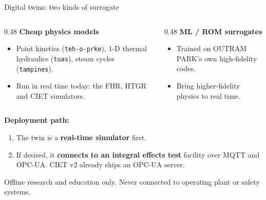 \documentclass[aspectratio=169]{beamer}
\begin{document}
\begin{frame}{Digital twins: two kinds of surrogate}
    \begin{columns}[T]
        \begin{column}{0.48\textwidth}
            \textbf{Cheap physics models}
            \begin{itemize}
                \footnotesize
                \item Point kinetics (\texttt{teh-o-prke}), 1-D thermal
                      hydraulics (\texttt{tuas}), steam cycles
                      (\texttt{tampines}).
                \item Run in real time today: the FHR, HTGR and CIET
                      simulators.
            \end{itemize}
        \end{column}
        \begin{column}{0.48\textwidth}
            \textbf{ML / ROM surrogates}
            \begin{itemize}
                \footnotesize
                \item Trained on OUTRAM PARK's own high-fidelity codes.
                \item Bring higher-fidelity physics to real time.
            \end{itemize}
        \end{column}
    \end{columns}

    \medskip
    \textbf{Deployment path:}
    \begin{enumerate}
        \item The twin is a \textbf{real-time simulator} first.
        \item If desired, it \textbf{connects to an integral effects test}
              facility over MQTT and OPC-UA. CIET v2 already ships an
              OPC-UA server.
    \end{enumerate}

    \medskip
    \footnotesize
    Offline research and education only. Never connected to operating plant
    or safety systems.
\end{frame}
\end{document}
